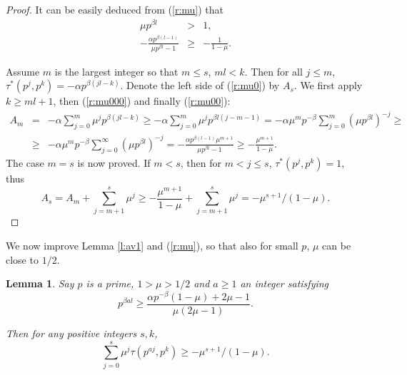 \documentclass{amsart}
\newtheorem {lemma}{Lemma}
\numberwithin {equation}{section}
\begin{document}
\begin{proof}
It can be easily deduced from (\ref{r:mu}) that 
\begin{eqnarray}
\mu p^{\beta l}&>&1,  \label{r:mu000} \\
-\frac{\alpha p^{\beta (l-1)}}{\mu p^{\beta l}-1}&\geq &-\frac{1}{1-\mu }.
\label{r:mu00}
\end{eqnarray}

Assume $m$ is the largest integer so that $m\leq s$, $ml<k$. Then for all $j\leq m$, $\tau ^{\ast }(p^{j},p^{k})=-\alpha p^{\beta (jl-k)}$. Denote the
left side of (\ref{r:mu0}) by $A_{s}$. We first apply $k\geq ml+1$, then (\ref{r:mu000}) and finally (\ref{r:mu00}): 
\begin{eqnarray*}
A_{m} &=&-\alpha \sum_{j=0}^{m}\mu ^{j}p^{\beta (jl-k)}\geq -\alpha
\sum_{j=0}^{m}\mu ^{j}p^{\beta l(j-m-1)}=-\alpha \mu ^{m}p^{-\beta
}\sum_{j=0}^{m}(\mu p^{\beta l})^{-j}\geq \\
&\geq &-\alpha \mu ^{m}p^{-\beta }\sum_{j=0}^{\infty }(\mu p^{\beta
l})^{-j}=-\frac{\alpha p^{\beta (l-1)}\mu ^{m+1}}{\mu p^{\beta l}-1}\geq -\frac{\mu ^{m+1}}{1-\mu }{\text{.}}
\end{eqnarray*}The case $m=s$ is now proved. If $m<s$, then for $m<j\leq s$, $\tau ^{\ast
}(p^{j},p^{k})=1$, thus 
\begin{equation*}
A_{s}=A_{m}+\sum_{j=m+1}^{s}\mu ^{j}\geq -\frac{\mu ^{m+1}}{1-\mu }+\sum_{j=m+1}^{s}\mu ^{j}=-\mu ^{s+1}/(1-\mu ){\text{.}}
\end{equation*}
\end{proof}

We now improve Lemma \ref{l:av1} and (\ref{r:mu}), so that also for small $p$, $\mu $ can be close to $1/2$.

\begin{lemma}
\label{l:av15}Say $p$ is a prime, $1>\mu >1/2$ and $a\geq 1$ an integer
satisfying 
\begin{equation}
p^{\beta al}\geq \frac{\alpha p^{-\beta }(1-\mu )+2\mu -1}{\mu (2\mu -1)}.
\label{r:mu25}
\end{equation}

Then for any positive integers $s,k$, 
\begin{equation}
\sum _{j=0}^{s}\mu ^{j}\tau (p^{aj},p^{k})\geq -\mu ^{s+1}/(1-\mu ){\text {.}}  \label{r:mu25b}
\end{equation}
\end{lemma}
\end{document}
